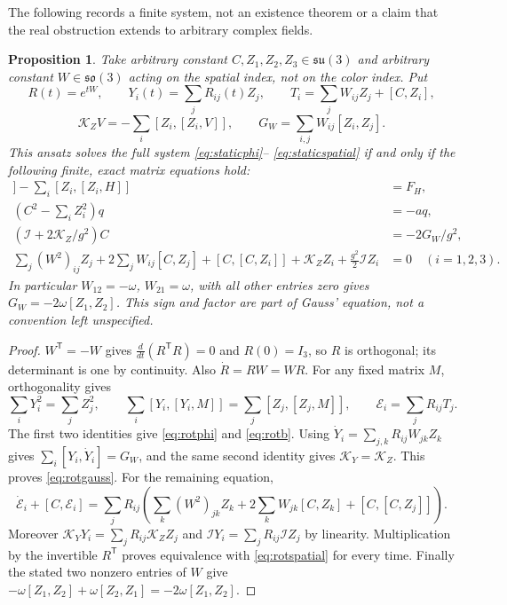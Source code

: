 \documentclass[11pt]{article}
\newtheorem{proposition}[theorem]{Proposition}
\newcommand{\su}{\mathfrak{su}}
\newcommand{\so}{\mathfrak{so}}
\begin{document}
The following records a finite system, not an existence theorem or a
claim that the real obstruction extends to arbitrary complex fields.

\begin{proposition}\label{prop:rotation}
Take arbitrary constant $C,Z_1,Z_2,Z_3\in\su(3)$ and arbitrary constant
$W\in\so(3)$ acting on the spatial index, not on the color index. Put
\[
 R(t)=e^{tW},\qquad Y_i(t)=\sum_jR_{ij}(t)Z_j,
 \qquad T_i=\sum_jW_{ij}Z_j+[C,Z_i],
\]
\[
 \mathcal K_Z V=-\sum_i[Z_i,[Z_i,V]],\qquad
 G_W=\sum_{i,j}W_{ij}[Z_i,Z_j].
\]
This ansatz solves the full system \eqref{eq:staticphi}--
\eqref{eq:staticspatial} if and only if the following finite, exact
matrix equations hold:
\begin{align}
 [C,[C,H]]-\sum_i[Z_i,[Z_i,H]]&=F_H,\label{eq:rotphi}\\
 (C^2-\sum_iZ_i^2)q&=-aq,\label{eq:rotb}\\
 (\mathcal I+2\mathcal K_Z/g^2)C&=-2G_W/g^2,\label{eq:rotgauss}\\
 \sum_j(W^2)_{ij}Z_j+2\sum_jW_{ij}[C,Z_j]+[C,[C,Z_i]]
 +\mathcal K_ZZ_i+\frac{g^2}{2}\mathcal I Z_i&=0
 \quad(i=1,2,3).\label{eq:rotspatial}
\end{align}
In particular $W_{12}=-\omega$, $W_{21}=\omega$, with all other entries
zero gives $G_W=-2\omega[Z_1,Z_2]$. This sign and factor are part of
Gauss' equation, not a convention left unspecified.
\end{proposition}
\begin{proof}
$W^{\mathsf T}=-W$ gives
$\frac{d}{dt}(R^{\mathsf T}R)=0$ and $R(0)=I_3$, so $R$ is
orthogonal; its determinant is one by continuity. Also $\dot R=RW=WR$.
For any fixed matrix $M$, orthogonality gives
\[
 \sum_iY_i^2=\sum_jZ_j^2,\qquad
 \sum_i[Y_i,[Y_i,M]]=\sum_j[Z_j,[Z_j,M]],
 \qquad\mathcal E_i=\sum_jR_{ij}T_j.
\]
The first two identities give \eqref{eq:rotphi} and \eqref{eq:rotb}.
Using $\dot Y_i=\sum_{j,k}R_{ij}W_{jk}Z_k$ gives
$\sum_i[Y_i,\dot Y_i]=G_W$, and the same second identity gives
$\mathcal K_Y=\mathcal K_Z$. This proves \eqref{eq:rotgauss}.
For the remaining equation,
\[
 \dot{\mathcal E}_i+[C,\mathcal E_i]
 =\sum_jR_{ij}\left(
 \sum_k(W^2)_{jk}Z_k+2\sum_kW_{jk}[C,Z_k]+[C,[C,Z_j]]\right).
\]
Moreover $\mathcal K_YY_i=\sum_jR_{ij}\mathcal K_ZZ_j$ and
$\mathcal I Y_i=\sum_jR_{ij}\mathcal I Z_j$ by linearity.
Multiplication by the invertible $R^{\mathsf T}$ proves equivalence
with \eqref{eq:rotspatial} for every time. Finally the stated two
nonzero entries of $W$ give
$-\omega[Z_1,Z_2]+\omega[Z_2,Z_1]=-2\omega[Z_1,Z_2]$.
\end{proof}
\end{document}
